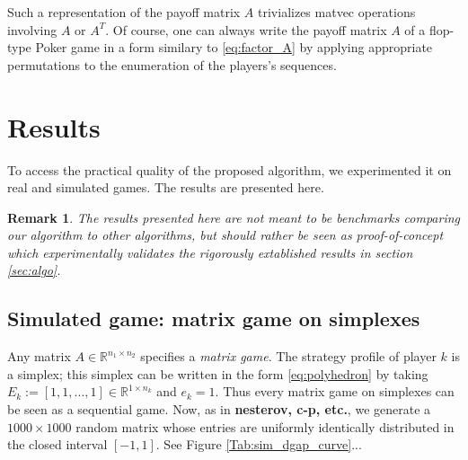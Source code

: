 \documentclass[12pt]{article}
\newtheorem{remark}{Remark}
\begin{document}
Such a representation of the payoff matrix $A$ trivializes matvec operations involving $A$ or $A^T$. Of course, one can always write the payoff matrix $A$ of a flop-type Poker game in a form similary to \eqref{eq:factor_A} by applying appropriate permutations to the enumeration of the players's sequences.

\section{Results}
\label{sec:results}
To access the practical quality of the proposed algorithm, we experimented it on real and simulated games. The results are presented here.

\begin{remark}
The results presented here are not meant to be benchmarks comparing our algorithm to other algorithms, but should rather be seen as proof-of-concept which experimentally  validates the rigorously extablished results in section \ref{sec:algo}.

\end{remark}

\subsection{Simulated game: matrix game on simplexes}
Any matrix $A \in \mathbb{R}^{n_1 \times n_2}$ specifies a \textit{matrix game}. The strategy profile of player $k$ is a simplex; this simplex can be written in the form \eqref{eq:polyhedron} by taking $E_k := [1, 1, ..., 1] \in \mathbb{R}^{1 \times n_k}$ and $e_k = 1$. Thus every matrix game on simplexes can be seen as a sequential game. Now, as in \textbf{nesterov, c-p, etc.}, we generate a $1000 \times 1000$ random matrix whose entries are uniformly identically distributed in the closed interval $[-1, 1]$.
See Figure \ref{Tab:sim_dgap_curve}...
\end{document}
